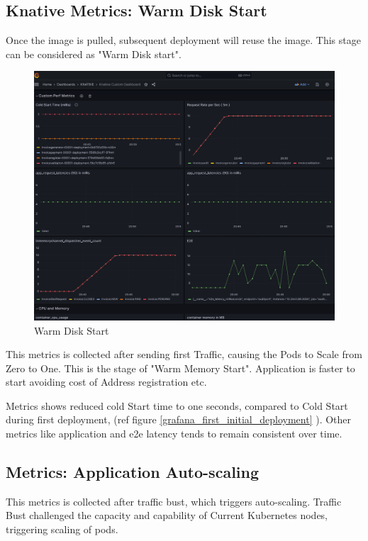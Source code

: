 \documentclass{article}
\begin{document}
\begin{flushleft}
\subsection{Knative Metrics: Warm Disk Start}
Once the image is pulled, subsequent deployment will reuse the image. This stage can be considered as "Warm Disk start".
\pagebreak
\begin{figure}[h]
    \centering
    \includegraphics[scale=0.5]{images/Grafana/Grafana_WarmStart.PNG}
    \caption{Warm Disk Start}
    \label{warm_disk_start}
\end{figure}
\par
This metrics is collected after sending first Traffic, causing the Pods to Scale from Zero to One. This is the stage of "Warm Memory Start". Application is faster to start avoiding cost of Address registration etc.
\par
Metrics shows reduced cold Start time to one seconds, compared to Cold Start during first deployment, (ref figure \ref{grafana_first_initial_deployment} ). Other metrics like application and e2e latency tends to remain consistent over time.  
\pagebreak

\par
\subsection{Metrics: Application Auto-scaling}
 This metrics is collected after traffic bust, which triggers auto-scaling. Traffic Bust challenged the capacity and capability of Current Kubernetes nodes, triggering scaling of pods. 


\end{flushleft}
\end{document}
